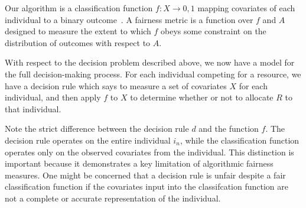 Our algorithm is a classification function $f: X \to {0, 1}$ mapping covariates
of each individual to a binary outcome~\cite{CorbettDavies_2023}. A fairness
metric is a function over $f$ and $A$ designed to measure the extent to which
$f$ obeys some constraint on the distribution of outcomes with respect to $A$.

With respect to the decision problem described above, we now have a model for 
the full decision-making process. For each individual competing for a resource,
we have a decision rule which says to measure a set of covariates $X$ for each
individual, and then apply $f$ to $X$ to determine whether or not to allocate
$R$ to that individual.

Note the strict difference between the decision rule $d$ and the function $f$.
The decision rule operates on the entire individual $i_n$, while the
classification function operates only on the observed covariates from the
individual. This distinction is important because it demonstrates a key
limitation of algorithmic fairness measures. One might be concerned that a
decision rule is unfair despite a fair classification function if the covariates
input into the classifcation function are not a complete or accurate
representation of the individual.

